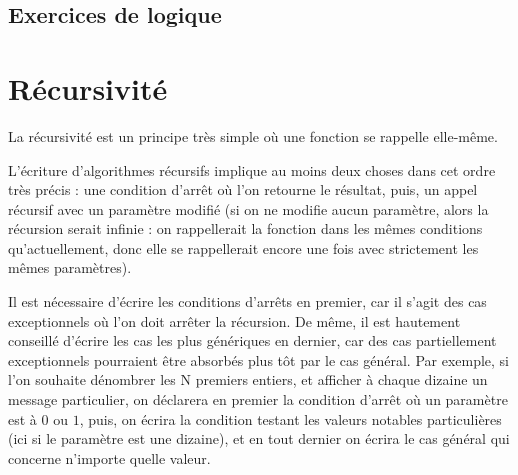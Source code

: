 \documentclass[11pt,a4paper]{article}
\begin{document}

\subsection{Exercices de logique}





\newpage


\section{Récursivité}

\bigskip

La récursivité est un principe très simple où une fonction se rappelle elle-même. %

\smallskip

L'écriture d'algorithmes récursifs implique au moins deux choses dans cet ordre très précis : une condition d'arrêt où l'on retourne le résultat, puis, un appel récursif avec un paramètre modifié (si on ne modifie aucun paramètre, alors la récursion serait infinie : on rappellerait la fonction dans les mêmes conditions qu'actuellement, donc elle se rappellerait encore une fois avec strictement les mêmes paramètres).

\smallskip

Il est nécessaire d'écrire les conditions d'arrêts en premier, car il s'agit des cas exceptionnels où l'on doit arrêter la récursion.
De même, il est hautement conseillé d'écrire les cas les plus génériques en dernier, car des cas partiellement exceptionnels pourraient être absorbés plus tôt par le cas général.
Par exemple, si l'on souhaite dénombrer les N premiers entiers, et afficher à chaque dizaine un message particulier, on déclarera en premier la condition d'arrêt où un paramètre est à $ 0 $ ou $ 1 $, puis, on écrira la condition testant les valeurs notables particulières (ici si le paramètre est une dizaine), et en tout dernier on écrira le cas général qui concerne n'importe quelle valeur.
\end{document}
